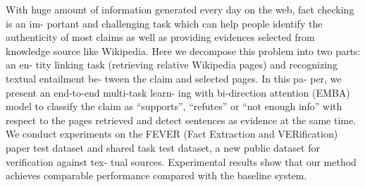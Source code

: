 With huge amount of information generated every day on the web, fact checking is an im- portant and challenging task which can help people identify the authenticity of most claims as well as providing evidences selected from knowledge source like Wikipedia. Here we decompose this problem into two parts: an en- tity linking task (retrieving relative Wikipedia pages) and recognizing textual entailment be- tween the claim and selected pages. In this pa- per, we present an end-to-end multi-task learn- ing with bi-direction attention (EMBA) model to classify the claim as ``supports'', ``refutes'' or ``not enough info'' with respect to the pages retrieved and detect sentences as evidence at the same time. We conduct experiments on the FEVER (Fact Extraction and VERification) paper test dataset and shared task test dataset, a new public dataset for verification against tex- tual sources. Experimental results show that our method achieves comparable performance compared with the baseline system.
